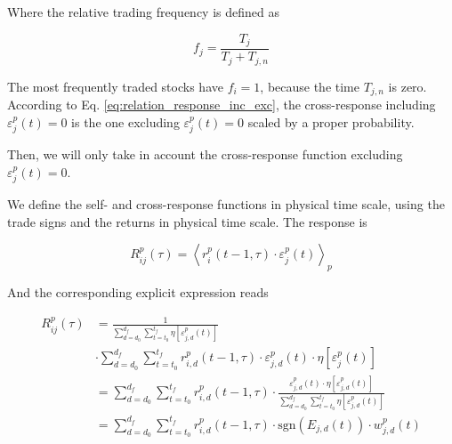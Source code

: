 Where the relative trading frequency is defined as \cite{Wang_2016_avg}

\begin{equation}\label{eq:response_trading_frequency}
    f_{j}=\frac{T_{j}}{T_{j}+T_{j,n}}
\end{equation}

The most frequently traded stocks have $f_{i} = 1$, because the time $T_{j,n}$
is zero. According to Eq. \ref{eq:relation_response_inc_exc}, the
cross-response including $\varepsilon^{p}_j \left( t\right) = 0$ is the one
excluding $\varepsilon^{p}_j \left( t\right) = 0$ scaled by a proper
probability.

Then, we will only take in account the cross-response function excluding
$\varepsilon^{p}_j \left( t\right) = 0$.

We define the self- and cross-response functions in physical time scale, using
the trade signs and the returns in physical time scale. The response is

\begin{equation}\label{eq:response_functions_time_scale_general}
    R^{p}_{ij}\left(\tau\right)=\left\langle r^{p}_{i}\left(t-1, \tau\right)
    \cdot\varepsilon_{j}^{p} \left(t\right)
    \right\rangle _{p}
\end{equation}

And the corresponding explicit expression reads

\begin{align}\label{eq:response_seconds_explicit}
    R_{ij}^{p}\left(\tau\right)&=\frac{1}{\sum_{d=d_{0}}^{d_{f}}
    \sum_{t=t_{0}}^{t_{f}} \eta\left[ \varepsilon_{j,d}^{p}
    \left(t\right)\right]} \nonumber \\
    &\cdot\sum_{d=d_{0}}^{d_{f}} \sum_{t=t_{0}}^{t_{f}}
    r^{p}_{i,d}\left(t-1,\tau\right) \cdot\varepsilon_{j,d}^{p}\left(t\right)
    \cdot\eta\left[\varepsilon_{j}^{p} \left(t\right)\right] \\
    &=\sum_{d=d_{0}}^{d_{f}}\sum_{t=t_{0}}^{t_{f}}r^{p}_{i,d}
    \left(t-1,\tau\right) \cdot\frac{\varepsilon_{j,d}^{p}\left(t\right)
    \cdot\eta\left[\varepsilon_{j,d}^{p} \left( t\right)\right]}
    {\sum_{d=d_{0}}^{d_{f}}\sum_{t=t_{0}}^{t_{f}}\eta
    \left[\varepsilon_{j,d}^{p} \left(t\right)\right]} \nonumber \\
    &=\sum_{d=d_{0}}^{d_{f}}\sum_{t=t_{0}}^{t_{f}}r^{p}_{i,d}
    \left(t-1,\tau\right) \cdot\text{sgn}\left(E_{j,d}\left(t\right)\right)
    \cdot w_{j,d}^{p}\left(t\right)
\end{align}

